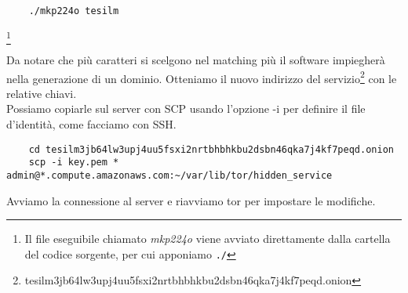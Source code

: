 \begin{lstlisting}
    ./mkp224o tesilm
\end{lstlisting}
\footnote{Il file eseguibile chiamato \emph{mkp224o} viene avviato direttamente dalla cartella del codice sorgente, per cui apponiamo \lstinline{./}}

Da notare che più caratteri si scelgono nel matching più il software impiegherà nella generazione di un dominio. 
Otteniamo il nuovo indirizzo del servizio\footnote{tesilm3jb64lw3upj4uu5fsxi2nrtbhbhkbu2dsbn46qka7j4kf7peqd.onion} con le relative chiavi. \\
Possiamo copiarle sul server con SCP usando l'opzione -i per definire il file d'identità, come facciamo con SSH.

\begin{lstlisting}
    cd tesilm3jb64lw3upj4uu5fsxi2nrtbhbhkbu2dsbn46qka7j4kf7peqd.onion
    scp -i key.pem * admin@*.compute.amazonaws.com:~/var/lib/tor/hidden_service
\end{lstlisting}

Avviamo la connessione al server e riavviamo tor per impostare le modifiche.



\newpage

